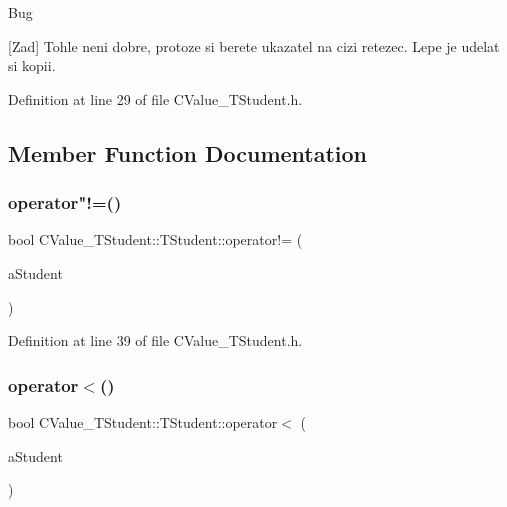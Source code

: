 \begin{DoxyRefDesc}{Bug}
\item[\hyperlink{bug__bug000001}{Bug}]\mbox{[}Zad\mbox{]} Tohle neni dobre, protoze si berete ukazatel na cizi retezec. Lepe je udelat si kopii. \end{DoxyRefDesc}


Definition at line 29 of file C\+Value\+\_\+\+T\+Student.\+h.



\subsection{Member Function Documentation}
\mbox{\label{struct_c_value___t_student_1_1_t_student_aaadc7d5525e434de77c6874052174903}} 
\subsubsection{\texorpdfstring{operator"!=()}{operator!=()}}
{\footnotesize\ttfamily bool C\+Value\+\_\+\+T\+Student\+::\+T\+Student\+::operator!= (\begin{DoxyParamCaption}\item[{const \hyperlink{struct_c_value___t_student_1_1_t_student}{T\+Student} \&}]{a\+Student }\end{DoxyParamCaption})\hspace{0.3cm}{\ttfamily [inline]}}



Definition at line 39 of file C\+Value\+\_\+\+T\+Student.\+h.

\mbox{\label{struct_c_value___t_student_1_1_t_student_a0e70d174799ef62209bfd2719077f127}} 
\subsubsection{\texorpdfstring{operator$<$()}{operator<()}}
{\footnotesize\ttfamily bool C\+Value\+\_\+\+T\+Student\+::\+T\+Student\+::operator$<$ (\begin{DoxyParamCaption}\item[{const \hyperlink{struct_c_value___t_student_1_1_t_student}{T\+Student} \&}]{a\+Student }\end{DoxyParamCaption})\hspace{0.3cm}{\ttfamily [inline]}}



